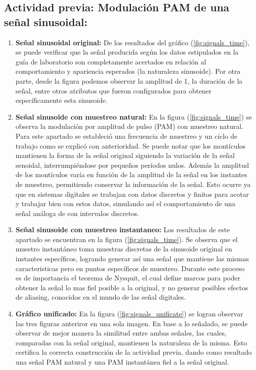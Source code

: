 \documentclass[12pt]{article}
\begin{document}
\subsection{Actividad previa: Modulación PAM de una señal sinusoidal: }
\begin{enumerate}
    \item \textbf{Señal sinusoidal original: } De los resultados del gráfico (\ref{fig:signals_time}), se puede verificar que la señal 
    producida según los datos estipulados en la guía de laboratorio son completamente acertados en relación al comportamiento y apariencia esperados (la naturaleza sinusoide). Por otra parte, desde la figura podemos observar la amplitud de 1, la duración de la señal, entre otros atributos que fueron configurados para obtener específicamente esta sinusoide. 

    \item \textbf{Señal sinusoide con muestreo natural:} En la figura (\ref{fig:signals_time}) se observa la modulación por amplitud de pulso (PAM) con muestreo natural. Para este apartado se estableció una frecuencia de muestreo y un ciclo de trabajo como se explicó con anterioridad. Se puede notar que los montículos mantienen la forma de la señal original siguiendo la variación de la señal senoidal, interrumpiéndose por pequeños períodos nulos. Además la amplitud de los montículos varía en función de la amplitud de la señal en los instantes de muestreo, permitiendo conservar la información de la señal. Esto ocurre ya que en sistemas digitales se trabajan con datos discretos y finitos para acotar y trabajar bien con estos datos, simulando así el comportamiento de una señal análoga de con intervalos discretos.

    \item \textbf{Señal sinusoide con muestreo instantaneo:} Los resultados de este apartado se encuentran en la figura (\ref{fig:signals_time}). Se 
    observa que el muestro instantáneo toma muestras discretas de la sinusoide original en instantes específicos, logrando generar así una señal que mantiene las mismas caracteristicas pero en puntos específicos de muestreo. Durante este proceso es de importancia el teorema de Nysquit, el cual define marcos para poder obtener la señal lo mas fiel posible a la original, y no generar posibles efectos de aliasing, conocidos en el mundo de las señal digitales.

    \item \textbf{Gráfico unificado:} En la figura (\ref{fig:signals_unificate}) se logran observar las tres figuras anteriror en una sola imagen. En base a lo señalado, se puede observar de mejor manera la similitud entre ambas señales, las cuales, comparadas con la señal original, mantienen la naturaleza de la misma. Esto certifica la correcta construcción de la actividad previa, dando como resultado una señal PAM natural y una PAM instantánea fiel a la señal original.
\end{enumerate}
\end{document}

